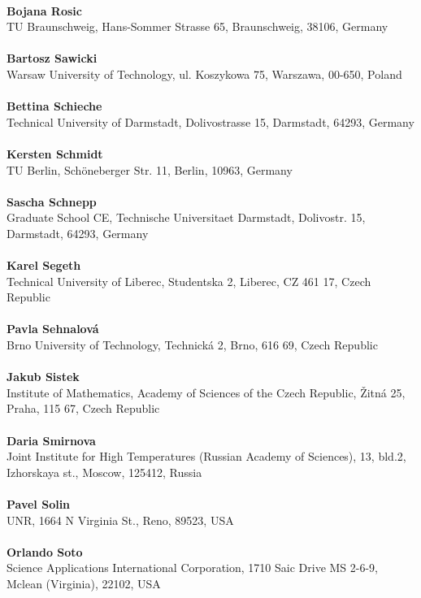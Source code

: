\\ 
\textbf{Bojana Rosic}
\\ 
TU Braunschweig, Hans-Sommer Strasse 65, Braunschweig, 38106, Germany\\ 
\\ 
\textbf{Bartosz Sawicki}
\\ 
Warsaw University of Technology, ul. Koszykowa 75, Warszawa, 00-650, Poland\\ 
\\ 
\textbf{Bettina Schieche}
\\ 
Technical University of Darmstadt, Dolivostrasse 15, Darmstadt, 64293, Germany\\ 
\\ 
\textbf{Kersten Schmidt}
\\ 
TU Berlin, Sch\"oneberger Str. 11, Berlin, 10963, Germany\\ 
\\ 
\textbf{Sascha Schnepp}
\\ 
Graduate School CE, Technische Universitaet Darmstadt, Dolivostr. 15, Darmstadt, 64293, Germany\\ 
\\ 
\textbf{Karel Segeth}
\\ 
Technical University of Liberec, Studentska 2, Liberec, CZ 461 17, Czech Republic\\ 
\\ 
\textbf{Pavla Sehnalov\'a}
\\ 
Brno University of Technology, Technick\'a 2, Brno, 616 69, Czech Republic\\ 
\\ 
\textbf{Jakub Sistek}
\\ 
Institute of Mathematics, Academy of Sciences of the Czech Republic, Žitn\'a 25, Praha, 115 67, Czech Republic\\ 
\\ 
\textbf{Daria Smirnova}
\\ 
Joint Institute for High Temperatures (Russian Academy of Sciences), 13, bld.2, Izhorskaya st., Moscow, 125412, Russia\\ 
\\ 
\textbf{Pavel Solin}
\\ 
UNR, 1664 N Virginia St., Reno, 89523, USA\\ 
\\ 
\textbf{Orlando Soto}
\\ 
Science Applications International Corporation, 1710 Saic Drive MS 2-6-9, Mclean (Virginia), 22102, USA\\ 
